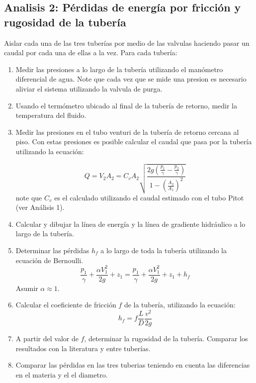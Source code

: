 \documentclass[10pt, a4paper]{exam}
\begin{document}
\subsection{Analisis 2: P\'erdidas de energ\'ia por fricci\'on y rugosidad de la tuber\'ia}
Aislar cada una de las tres tuber\'ias por medio de las valvulas haciendo pasar un caudal por cada una de ellas a la vez. Para cada tuber\'ia:
\begin{enumerate}
\item Medir las presiones a lo largo de la tuber\'ia utilizando el man\'ometro diferencial de agua. Note que cada vez que se mide una presion es necesario aliviar el sistema utilizando la valvula de purga. 
\item Usando el term\'ometro ubicado al final de la tuber\'ia de retorno, medir la temperatura del fluido.
\item Medir las presiones en el tubo venturi de la tuber\'ia de retorno cercana al piso. Con estas presiones es posible calcular el caudal que pasa por la tuber\'ia utilizando la ecuaci\'on:

    $$
    Q=V_2 A_2 = C_v A_2 \sqrt{\frac{2g\left(\frac{p_1}{\gamma}-\frac{p_2}{\gamma}\right)}{1-\left(\frac{A_2}{A_1}\right)^2}}
    $$
note que $C_v$ es el calculado utilizando el caudal estimado con el tubo Pitot (ver An\'alisis 1).

\item Calcular y dibujar la l\'inea de energ\'ia y la l\'inea de gradiente hidr\'aulico a lo largo de la tuber\'ia.
\item Determinar las p\'erdidas $h_f$ a lo largo de toda la tuber\'ia utilizando la ecuaci\'on de Bernoulli.
    $$
    \frac{p_1}{\gamma}+\frac{\alpha V_1^2}{2g} + z_1 = \frac{p_1}{\gamma}+\frac{\alpha V_1^2}{2g} + z_1 + h_f
    $$
    Asumir $\alpha \approx 1$.

\item Calcular el coeficiente de fricci\'on $f$ de la tuber\'ia, utilizando la ecuaci\'on:
$$
h_f = f \frac{L}{D} \frac{v^2}{2g}
$$ 
\item A partir del valor de $f$, determinar la rugosidad de la tuber\'ia. Comparar los resultados con la literatura y entre tuber\'ias.
\item Comparar las p\'erdidas en las tres tuberias teniendo en cuenta las diferencias en el materia y el el diametro. 
\end{enumerate}
\end{document}
